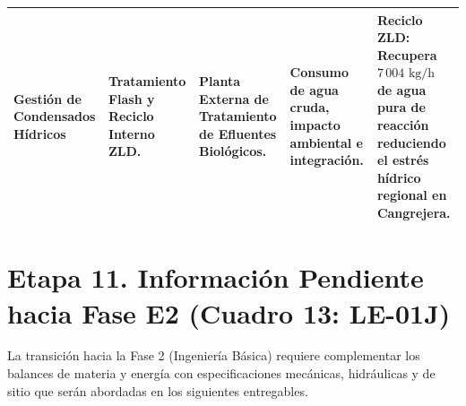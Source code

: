 \documentclass[10pt,letterpaper]{article}
\begin{document}
\begin{table}[H]
\begin{tabularx}{\textwidth}{>{\raggedright\arraybackslash}p{2.35cm} >{\raggedright\arraybackslash}p{2.45cm} >{\raggedright\arraybackslash}p{2.45cm} >{\raggedright\arraybackslash}p{2.15cm} X}
Gestión de Condensados Hídricos & Tratamiento Flash y Reciclo Interno ZLD. & Planta Externa de Tratamiento de Efluentes Biológicos. & Consumo de agua cruda, impacto ambiental e integración. & \textbf{Reciclo ZLD:} Recupera $7\,004\text{ kg/h}$ de agua pura de reacción reduciendo el estrés hídrico regional en Cangrejera. \\
\bottomrule
\end{tabularx}
\end{table}

\newpage
\section{Etapa 11. Información Pendiente hacia Fase E2 (Cuadro 13: LE-01J)}

La transición hacia la Fase 2 (Ingeniería Básica) requiere complementar los balances de materia y energía con especificaciones mecánicas, hidráulicas y de sitio que serán abordadas en los siguientes entregables.
\end{document}
